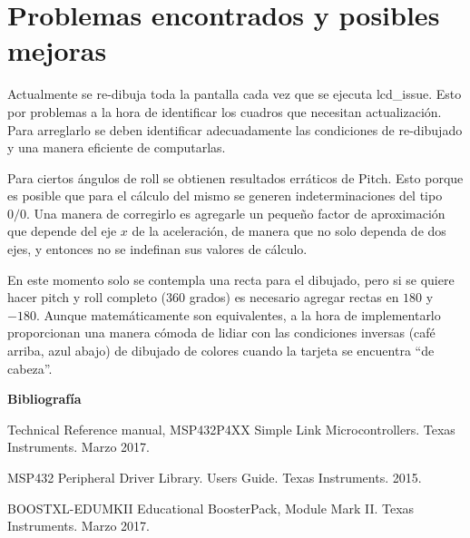 \section{Problemas encontrados y posibles mejoras}

Actualmente se re-dibuja toda la pantalla cada vez que se ejecuta lcd\_issue.
Esto por problemas a la hora de identificar los cuadros que necesitan
actualización. Para arreglarlo se deben identificar adecuadamente las
condiciones de re-dibujado y una manera eficiente de computarlas.

Para ciertos ángulos de roll se obtienen resultados erráticos de Pitch. Esto
porque es posible que para el cálculo del mismo se generen indeterminaciones del
tipo $0/0$. Una manera de corregirlo es agregarle un pequeño factor de
aproximación que depende del eje $x$ de la aceleración, de manera que no solo
dependa de dos ejes, y entonces no se indefinan sus valores de cálculo.

En este momento solo se contempla una recta para el dibujado, pero si se quiere
hacer pitch y roll completo ($360$ grados) es necesario agregar rectas en $180$
y $-180$. Aunque matemáticamente son equivalentes, a la hora de implementarlo
proporcionan una manera cómoda de lidiar con las condiciones inversas (café
arriba, azul abajo) de dibujado de colores cuando la tarjeta se encuentra ``de
cabeza''.


\textbf{ Bibliografía}

Technical Reference manual, MSP432P4XX Simple Link Microcontrollers. Texas Instruments. Marzo 2017.

MSP432 Peripheral Driver Library. Users Guide. Texas Instruments. 2015.

BOOSTXL-EDUMKII Educational BoosterPack, Module Mark II. Texas Instruments. Marzo 2017.


%
%
